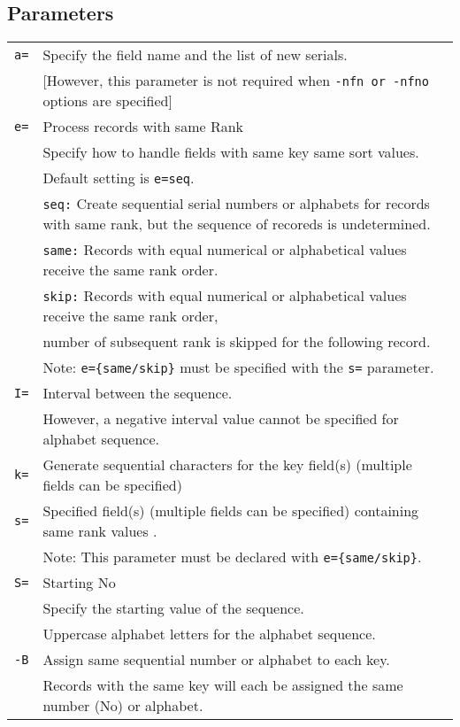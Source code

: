 \subsection*{Parameters}
\begin{table}[htbp]
{\small
\begin{tabular}{ll}
\verb|a=|    & Specify the field name and the list of new serials. \\
		& [However, this parameter is not required when \verb|-nfn or -nfno| options are specified] \\
\verb|e=|    & Process records with same Rank \\
             & Specify how to handle fields with same key same sort values. \\
             & Default setting is \verb|e=seq|. \\
             & \verb|seq:| Create sequential serial numbers or alphabets for records with same rank, but the sequence of recoreds is undetermined. \\
             & \verb|same:| Records with equal numerical or alphabetical values receive the same rank order. \\
             & \verb|skip:| Records with equal numerical or alphabetical values receive the same rank order, \\
             & number of subsequent rank is skipped for the following record. \\
             & Note: \verb|e={same/skip}| must be specified with the \verb|s=| parameter. \\
\verb|I=|    & Interval between the sequence. \\
		& However, a negative interval value cannot be specified for alphabet sequence. \\
\verb|k=|    & Generate sequential characters for the key field(s) (multiple fields can be specified) \\
\verb|s=|    & Specified field(s) (multiple fields can be specified) containing same rank values . \\
             & Note: This parameter must be declared with \verb|e={same/skip}|. \\
\verb|S=|    & Starting No \\
             & Specify the starting value of the sequence.  \\
             & Uppercase alphabet letters for the alphabet sequence. \\
 \verb|-B|   & Assign same sequential number or alphabet to each key.  \\
             & Records with the same key will each be assigned the same number (No) or alphabet.  \\
\end{tabular} 
}
\end{table} 

